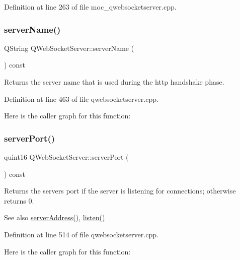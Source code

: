 Definition at line 263 of file moc\+\_\+qwebsocketserver.\+cpp.

\mbox{\label{class_q_web_socket_server_afe6a71eb2545bc81df2d847c66259d1f}} 
\subsubsection{\texorpdfstring{server\+Name()}{serverName()}}
{\footnotesize\ttfamily Q\+String Q\+Web\+Socket\+Server\+::server\+Name (\begin{DoxyParamCaption}{ }\end{DoxyParamCaption}) const}

Returns the server name that is used during the http handshake phase. 

Definition at line 463 of file qwebsocketserver.\+cpp.

Here is the caller graph for this function\+:
\mbox{\label{class_q_web_socket_server_aafc6ff4b146c2b049df45922a2d9be7e}} 
\subsubsection{\texorpdfstring{server\+Port()}{serverPort()}}
{\footnotesize\ttfamily quint16 Q\+Web\+Socket\+Server\+::server\+Port (\begin{DoxyParamCaption}{ }\end{DoxyParamCaption}) const}

Returns the server\textquotesingle{}s port if the server is listening for connections; otherwise returns 0.

\begin{DoxySeeAlso}{See also}
\mbox{\hyperlink{class_q_web_socket_server_a8c9df0e8ad799e0ea633db852f37497a}{server\+Address()}}, \mbox{\hyperlink{class_q_web_socket_server_a3859403d15dbb2b487a3990d68660841}{listen()}} 
\end{DoxySeeAlso}


Definition at line 514 of file qwebsocketserver.\+cpp.

Here is the caller graph for this function\+:
\mbox{\label{class_q_web_socket_server_aeb27943cc455da8fd6ea8e22ba3f2e60}} 
